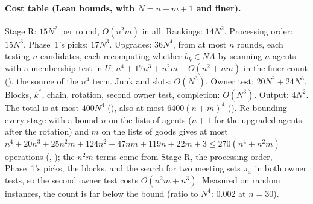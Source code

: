 \documentclass[runningheads,11pt]{llncs}
\newcommand{\NA}{\mathit{NA}}
\begin{document}
\paragraph{Cost table (Lean bounds, with $N=n+m+1$ and finer).} Stage R: $15N^2$ per round, $O(n^2m)$ in all. Rankings: $14N^2$. Processing order: $15N^3$. Phase~1's picks: $17N^3$. Upgrades: $36N^4$, from at most $n$ rounds, each testing $n$ candidates, each recomputing whether $b_k\in\NA$ by scanning $n$ agents with a membership test in $U$; $n^4+17n^3+n^2m+O(n^2+nm)$ in the finer count (), the source of the $n^4$ term. Junk and slots: $O(N^3)$. Owner test: $20N^2+24N^3$. Blocks, $k^*$, chain, rotation, second owner test, completion: $O(N^3)$. Output: $4N^2$. The total is at most $400N^4$ (), also at most $6400(n+m)^4$ (). Re-bounding every stage with a bound $n$ on the lists of agents ($n+1$ for the upgraded agents after the rotation) and $m$ on the lists of goods gives at most $n^4+20n^3+25n^2m+124n^2+47nm+119n+22m+3\le270(n^4+n^2m)$ operations (, ); the $n^2m$ terms come from Stage R, the processing order, Phase~1's picks, the blocks, and the search for two meeting sets $\pi_x$ in both owner tests, so the second owner test costs $O(n^2m+n^3)$. Measured on random instances, the count is far below the bound (ratio to $N^4$: $0.002$ at $n=30$).
\end{document}
